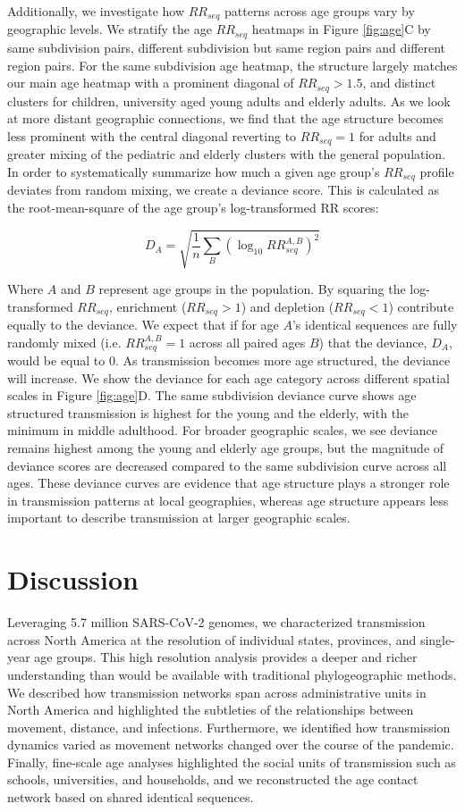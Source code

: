 \documentclass[11pt, letterpaper, oneside]{article}
\begin{document}
Additionally, we investigate how $RR_{seq}$ patterns across age groups vary by geographic levels.
We stratify the age $RR_{seq}$ heatmaps in Figure \ref{fig:age}C by same subdivision pairs, different subdivision but same region pairs and different region pairs.
For the same subdivision age heatmap, the structure largely matches our main age heatmap with a prominent diagonal of $RR_{seq} > 1.5$, and distinct clusters for children, university aged young adults and elderly adults.
As we look at more distant geographic connections, we find that the age structure becomes less prominent with the central diagonal reverting to $RR_{seq} = 1$ for adults and greater mixing of the pediatric and elderly clusters with the general population.
In order to systematically summarize how much a given age group's $RR_{seq}$ profile deviates from random mixing, we create a deviance score.
This is calculated as the root-mean-square of the age group's log-transformed RR scores:

\[D_A = \sqrt{\frac{1}{n}\sum_{B} \left( \log_{10} RR_{seq}^{A,B} \right)^2}\]

Where $A$ and $B$ represent age groups in the population.
By squaring the log-transformed $RR_{seq}$, enrichment ($RR_{seq} > 1$) and depletion ($RR_{seq} < 1$) contribute equally to the deviance.
We expect that if for age $A$'s identical sequences are fully randomly mixed (i.e. $RR_{seq}^{A,B} = 1$ across all paired ages $B$) that the deviance, $D_A$, would be equal to 0.
As transmission becomes more age structured, the deviance will increase.
We show the deviance for each age category across different spatial scales in Figure \ref{fig:age}D.
The same subdivision deviance curve shows age structured transmission is highest for the young and the elderly, with the minimum in middle adulthood.
For broader geographic scales, we see deviance remains highest among the young and elderly age groups, but the magnitude of deviance scores are decreased compared to the same subdivision curve across all ages.
These deviance curves are evidence that age structure plays a stronger role in transmission patterns at local geographies, whereas age structure appears less important to describe transmission at larger geographic scales.

\section{Discussion}

Leveraging 5.7 million SARS-CoV-2 genomes, we characterized transmission across North America at the resolution of individual states, provinces, and single-year age groups.
This high resolution analysis provides a deeper and richer understanding than would be available with traditional phylogeographic methods.
We described how transmission networks span across administrative units in North America and highlighted the subtleties of the relationships between movement, distance, and infections.
Furthermore, we identified how transmission dynamics varied as movement networks changed over the course of the pandemic.
Finally, fine-scale age analyses highlighted the social units of transmission such as schools, universities, and households, and we reconstructed the age contact network based on shared identical sequences.
\end{document}
